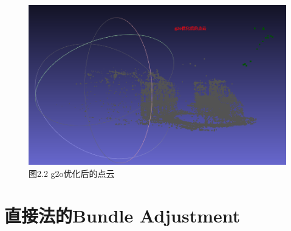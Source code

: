 \documentclass[40pt,a4paper，UTF8]{ctexart}
\numberwithin{equation}{section}
\begin{document}
\begin{figure}[H]
\centering
\includegraphics[width=4.8in]{ch7_2_2.jpg} {图2.2 g2o优化后的点云}
\end{figure}

\paragraph{}


\section{直接法的Bundle Adjustment}
\end{document}
